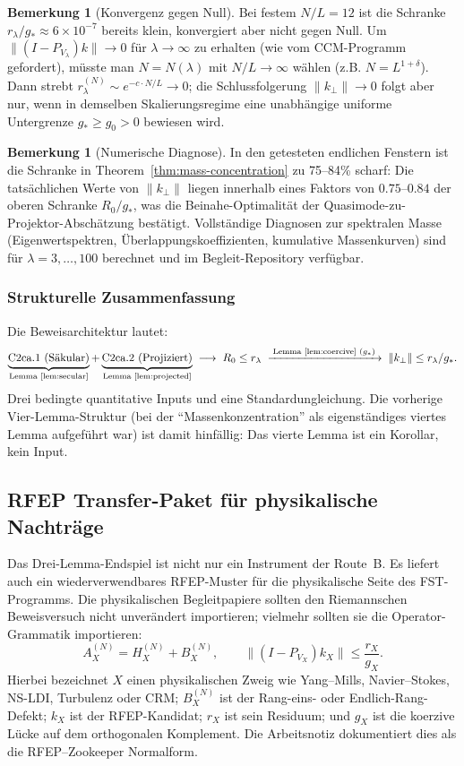 \documentclass[11pt,a4paper]{article}
\theoremstyle{plain}
\theoremstyle{definition}
\newtheorem{remark}[theorem]{Bemerkung}
\begin{document}
\begin{remark}[Konvergenz gegen Null]
Bei festem $N/L = 12$ ist die Schranke $r_\lambda/g_* \approx 6 \times
10^{-7}$ bereits klein, konvergiert aber nicht gegen Null. Um
$\|(I-P_{V_\lambda})k\| \to 0$ für $\lambda \to \infty$ zu erhalten (wie
vom CCM-Programm gefordert), müsste man $N = N(\lambda)$ mit
$N/L \to \infty$ wählen (z.B. $N = L^{1+\delta}$). Dann strebt
$r_\lambda^{(N)} \sim e^{-c \cdot N/L} \to 0$; die Schlussfolgerung
$\|k_\perp\| \to 0$ folgt aber nur, wenn in demselben Skalierungsregime
eine unabhängige uniforme Untergrenze $g_* \geq g_0 > 0$ bewiesen wird.
\end{remark}

\begin{remark}[Numerische Diagnose]
In den getesteten endlichen Fenstern ist die Schranke in
Theorem~\ref{thm:mass-concentration} zu 75--84\% scharf:
Die tatsächlichen Werte von $\|k_\perp\|$ liegen innerhalb eines Faktors
von $0.75$--$0.84$ der oberen Schranke $R_0/g_*$, was die Beinahe-Optimalität
der Quasimode-zu-Projektor-Abschätzung bestätigt. Vollständige Diagnosen
zur spektralen Masse (Eigenwertspektren, Überlappungskoeffizienten, kumulative
Massenkurven) sind für $\lambda = 3, \ldots, 100$ berechnet und im Begleit-Repository
verfügbar.
\end{remark}

\subsubsection{Strukturelle Zusammenfassung}

Die Beweisarchitektur lautet:
\[
\underbrace{\text{C2ca.1 (Säkular)}}_{\text{Lemma~\ref{lem:secular}}}
+ \underbrace{\text{C2ca.2 (Projiziert)}}_{\text{Lemma~\ref{lem:projected}}}
\;\longrightarrow\; R_0 \leq r_\lambda
\;\xrightarrow{\;\text{Lemma~\ref{lem:coercive} } (g_*)\;}
\;\|k_\perp\| \leq r_\lambda / g_*.
\]
Drei bedingte quantitative Inputs und eine Standardungleichung. Die vorherige
Vier-Lemma-Struktur (bei der ``Massenkonzentration''
als eigenständiges viertes Lemma aufgeführt war) ist damit hinfällig:
Das vierte Lemma ist ein Korollar, kein Input.

\subsection{RFEP Transfer-Paket für physikalische Nachträge}
\label{sec:rfep-physics-transfer}

Das Drei-Lemma-Endspiel ist nicht nur ein Instrument der Route~B. Es liefert
auch ein wiederverwendbares RFEP-Muster für die physikalische Seite des
FST-Programms. Die physikalischen Begleitpapiere sollten den Riemannschen
Beweisversuch nicht unverändert importieren; vielmehr sollten sie die Operator-Grammatik importieren:
\[
  A_X^{(N)} = H_X^{(N)} + B_X^{(N)}, \qquad
  \|(I-P_{V_X})k_X\| \leq \frac{r_X}{g_X}.
\]
Hierbei bezeichnet $X$ einen physikalischen Zweig wie Yang--Mills,
Navier--Stokes, NS-LDI, Turbulenz oder CRM; $B_X^{(N)}$ ist der
Rang-eins- oder Endlich-Rang-Defekt; $k_X$ ist der RFEP-Kandidat;
$r_X$ ist sein Residuum; und $g_X$ ist die koerzive Lücke auf dem
orthogonalen Komplement. Die Arbeitsnotiz \cite{RFEPTransferNote}
dokumentiert dies als die RFEP--Zookeeper Normalform.
\end{document}
